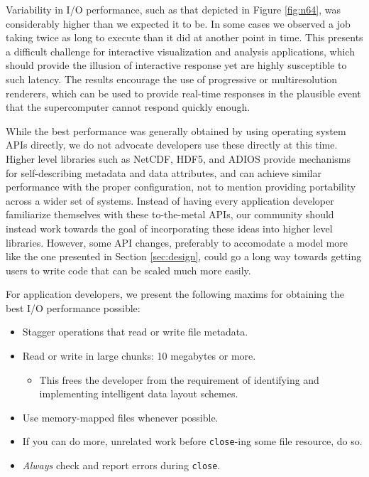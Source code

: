 Variability in I/O performance, such as that depicted in Figure
\ref{fig:n64}, was considerably higher than we expected it to be.  In
some cases we observed a job taking twice as long to execute than it
did at another point in time.  This presents a difficult challenge
for interactive visualization and analysis applications, which should
provide the illusion of interactive response yet are highly susceptible
to such latency.  The results encourage the use of progressive or
multiresolution renderers, which can be used to provide real-time
responses in the plausible event that the supercomputer cannot respond
quickly enough.

While the best performance was generally obtained by using operating
system APIs directly, we do not advocate developers use these directly
at this time.  Higher level libraries such as NetCDF, HDF5, and ADIOS
provide mechanisms for self-describing metadata and data attributes,
and can achieve similar performance with the proper configuration,
not to mention providing portability across a wider set of systems.
Instead of having every application developer familiarize themselves
with these to-the-metal APIs, our community should instead work towards
the goal of incorporating these ideas into higher level libraries.
However, some API changes, preferably to accomodate a model more like
the one
presented in Section \ref{sec:design}, could go a long way towards
getting users to write code that can be scaled much more easily.

For application developers, we present the following maxims for
obtaining the best I/O performance possible:

\begin{itemize}
  \item Stagger operations that read or write file metadata.
  \item Read or write in large chunks: 10 megabytes or more.
  \begin{itemize}
    \item This frees the developer from the requirement of
    identifying and implementing intelligent data layout schemes.
  \end{itemize}
  \item Use memory-mapped files whenever possible.
  \item If you can do more, unrelated work before \verb!close!-ing some
  file resource, do so.
  \item \emph{Always} check and report errors during \verb!close!.
\end{itemize}

